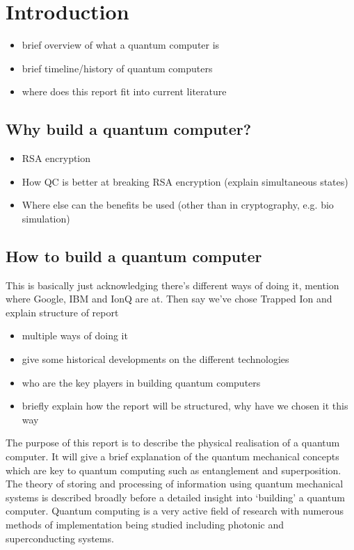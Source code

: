 \section{Introduction}
\begin{itemize}
    \item brief overview of what a quantum computer is
    \item brief timeline/history of quantum computers
    \item where does this report fit into current literature
\end{itemize}
\subsection{Why build a quantum computer?}
\begin{itemize}
    \item RSA encryption
    \item How QC is better at breaking RSA encryption (explain simultaneous states)
    \item Where else can the benefits be used (other than in cryptography, e.g. bio simulation)
\end{itemize}
\subsection{How to build a quantum computer}
This is basically just acknowledging there's different ways of doing it, mention where Google, IBM and IonQ are at. Then say we've chose Trapped Ion and explain structure of report 
\begin{itemize}
    \item multiple ways of doing it
    \item give some historical developments on the different technologies
    \item who are the key players in building quantum computers
    \item briefly explain how the report will be structured, why have we chosen it this way
\end{itemize}

The purpose of this report is to describe the physical realisation of a quantum computer. 
It will give a brief explanation of the quantum mechanical concepts which are key to quantum computing such as entanglement and superposition. 
The theory of storing and processing of information using quantum mechanical systems is described broadly before a detailed insight into `building' a quantum computer.
Quantum computing is a very active field of research with numerous methods of implementation being studied including photonic and superconducting systems. 

